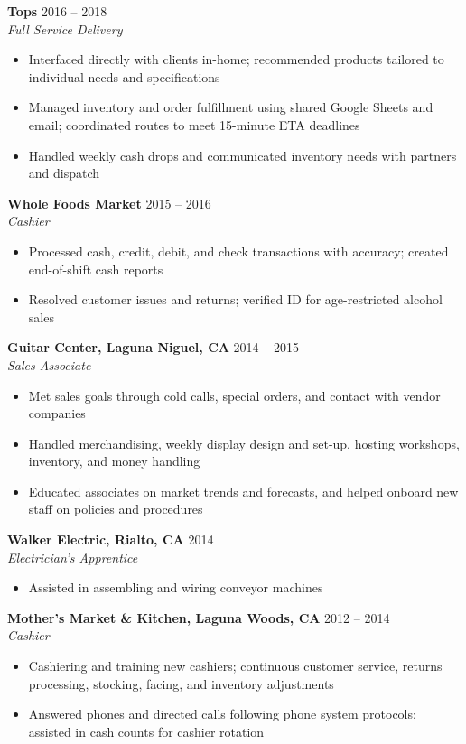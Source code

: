\documentclass[letterpaper,10.5pt]{article}
\newcommand{\role}[3]{%
  \vspace{3pt}%
  \textbf{#1} \hfill {\small #3}\\[1pt]%
  {\small\itshape #2}\vspace{-2pt}%
}
\begin{document}
\role{Tops}{Full Service Delivery}{2016 -- 2018}
\begin{itemize}
  \item Interfaced directly with clients in-home; recommended products tailored to individual needs
        and specifications
  \item Managed inventory and order fulfillment using shared Google Sheets and email; coordinated
        routes to meet 15-minute ETA deadlines
  \item Handled weekly cash drops and communicated inventory needs with partners and dispatch
\end{itemize}

\role{Whole Foods Market}{Cashier}{2015 -- 2016}
\begin{itemize}
  \item Processed cash, credit, debit, and check transactions with accuracy; created end-of-shift
        cash reports
  \item Resolved customer issues and returns; verified ID for age-restricted alcohol sales
\end{itemize}

\role{Guitar Center, Laguna Niguel, CA}{Sales Associate}{2014 -- 2015}
\begin{itemize}
  \item Met sales goals through cold calls, special orders, and contact with vendor companies
  \item Handled merchandising, weekly display design and set-up, hosting workshops, inventory, and
        money handling
  \item Educated associates on market trends and forecasts, and helped onboard new staff on
        policies and procedures
\end{itemize}

\role{Walker Electric, Rialto, CA}{Electrician's Apprentice}{2014}
\begin{itemize}
  \item Assisted in assembling and wiring conveyor machines
\end{itemize}

\role{Mother's Market \& Kitchen, Laguna Woods, CA}{Cashier}{2012 -- 2014}
\begin{itemize}
  \item Cashiering and training new cashiers; continuous customer service, returns processing,
        stocking, facing, and inventory adjustments
  \item Answered phones and directed calls following phone system protocols; assisted in cash
        counts for cashier rotation
\end{itemize}
\end{document}
